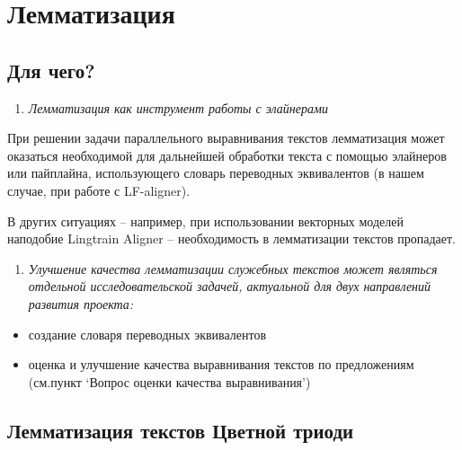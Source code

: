 \documentclass[
  letterpaper,
]{book}
\providecommand{\tightlist}{%
  \setlength{\itemsep}{0pt}\setlength{\parskip}{0pt}}\usepackage{longtable,booktabs,array}
\begin{document}
\hypertarget{ux43bux435ux43cux43cux430ux442ux438ux437ux430ux446ux438ux44f}{%
\chapter{\texorpdfstring{\textbf{Лемматизация}}{Лемматизация}}\label{ux43bux435ux43cux43cux430ux442ux438ux437ux430ux446ux438ux44f}}

\hypertarget{ux434ux43bux44f-ux447ux435ux433ux43e}{%
\section{Для чего?}\label{ux434ux43bux44f-ux447ux435ux433ux43e}}

\begin{enumerate}
\def\labelenumi{\arabic{enumi}.}
\tightlist
\item
  \emph{Лемматизация как инструмент работы с элайнерами}
\end{enumerate}

При решении задачи параллельного выравнивания текстов лемматизация может
оказаться необходимой для дальнейшей обработки текста с помощью
элайнеров или пайплайна, использующего словарь переводных эквивалентов
(в нашем случае, при работе с LF-aligner).

В других ситуациях -- например, при использовании векторных моделей
наподобие Lingtrain Aligner -- необходимость в лемматизации текстов
пропадает.

\begin{enumerate}
\def\labelenumi{\arabic{enumi}.}
\tightlist
\item
  \emph{Улучшение качества лемматизации служебных текстов может являться
  отдельной исследовательской задачей, актуальной для двух направлений
  развития проекта:}
\end{enumerate}

\begin{itemize}
\tightlist
\item
  создание словаря переводных эквивалентов
\item
  оценка и улучшение качества выравнивания текстов по предложениям
  (см.пункт `Вопрос оценки качества выравнивания')
\end{itemize}

\hypertarget{ux43bux435ux43cux43cux430ux442ux438ux437ux430ux446ux438ux44f-ux442ux435ux43aux441ux442ux43eux432-ux446ux432ux435ux442ux43dux43eux439-ux442ux440ux438ux43eux434ux438}{%
\section{Лемматизация текстов Цветной
триоди}\label{ux43bux435ux43cux43cux430ux442ux438ux437ux430ux446ux438ux44f-ux442ux435ux43aux441ux442ux43eux432-ux446ux432ux435ux442ux43dux43eux439-ux442ux440ux438ux43eux434ux438}}
\end{document}
